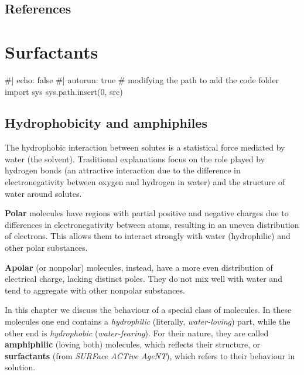 \documentclass[
  letterpaper,
  enabledeprecatedfontcommands]{report}
\newenvironment{Shaded}{\begin{snugshade}}{\end{snugshade}}
\newcommand{\NormalTok}[1]{\textcolor[rgb]{0.00,0.23,0.31}{#1}}
\begin{document}
\section*{References}\label{references-2}


\chapter{Surfactants}\label{surfactants}

\begin{Shaded}
\begin{Highlighting}[]
\NormalTok{\#| echo: false}
\NormalTok{\#| autorun: true}
\NormalTok{\# modifying the path to add the code folder}
\NormalTok{import sys}
\NormalTok{sys.path.insert(0, \textquotesingle{}src\textquotesingle{})}
\end{Highlighting}
\end{Shaded}

\section{Hydrophobicity and
amphiphiles}\label{hydrophobicity-and-amphiphiles}

The hydrophobic interaction between solutes is a statistical force
mediated by water (the solvent). Traditional explanations focus on the
role played by hydrogen bonds (an attractive interaction due to the
difference in electronegativity between oxygen and hydrogen in water)
and the structure of water around solutes.

\textbf{Polar} molecules have regions with partial positive and negative
charges due to differences in electronegativity between atoms, resulting
in an uneven distribution of electrons. This allows them to interact
strongly with water (hydrophilic) and other polar substances.

\textbf{Apolar} (or nonpolar) molecules, instead, have a more even
distribution of electrical charge, lacking distinct poles. They do not
mix well with water and tend to aggregate with other nonpolar
substances.

In this chapter we discuss the behaviour of a special class of
molecules. In these molecules one end contains a \emph{hydrophilic}
(literally, \emph{water-loving}) part, while the other end is
\emph{hydrophobic} (\emph{water-fearing}). For their nature, they are
called \textbf{amphiphilic} (loving both) molecules, which reflects
their structure, or \textbf{surfactants} (from \emph{SURFace ACTive
AgeNT}), which refers to their behaviour in solution.
\end{document}

